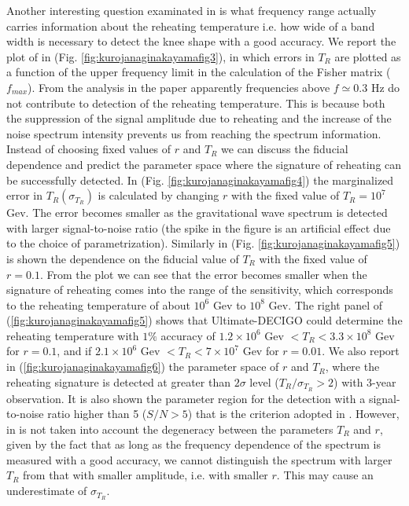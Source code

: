 \documentclass[11pt,a4paper,twoside]{book}
\begin{document}
Another interesting question examinated in \cite{Chap3:ProspectsForDeterminationWithDetectors} is what frequency range actually carries information about the reheating temperature i.e. how wide of a band  width is necessary to detect the knee shape with a good accuracy. We report the plot of \cite{Chap3:ProspectsForDeterminationWithDetectors} in (Fig. \ref{fig:kurojanaginakayamafig3}), in which errors in $ T_{R} $ are plotted as a function of the upper frequency limit in the calculation of the Fisher matrix ($ f_{max} $). From the analysis in the paper apparently frequencies above $ f \simeq 0.3$ Hz do not contribute to detection of the reheating temperature. This is because both the suppression of the signal amplitude due to reheating and the increase of the noise spectrum intensity prevents us from reaching the spectrum information.\\
Instead of choosing fixed values of $ r $ and $ T_{R} $ we can discuss the fiducial dependence and predict the parameter space where the signature of reheating can be successfully detected. In (Fig. \ref{fig:kurojanaginakayamafig4}) the marginalized error in $ T_{R}(\sigma_{T_{R}})$							
is calculated by changing $ r $ with the fixed value of $ T_{R}=10^{7} $ Gev. The error becomes smaller as the gravitational wave spectrum is detected with larger signal-to-noise ratio (the spike in the figure is an artificial effect due to the choice of parametrization). Similarly in (Fig. \ref{fig:kurojanaginakayamafig5}) is shown the dependence on the fiducial value of $ T_{R} $ with the fixed value of $ r = 0.1 $. From the plot we can see that the error becomes smaller when the signature of reheating comes into the range of the sensitivity, which corresponds to the reheating temperature of about $ 10^{6} $ Gev to $ 10^{8} $ Gev. The right panel of (\ref{fig:kurojanaginakayamafig5}) shows that Ultimate-DECIGO could determine the reheating temperature with $ 1 \% $ accuracy of $ 1.2 \times 10^{6} $ Gev $ < T_{R} <  3.3 \times 10^{8} $ Gev for $ r=0.1 $, and if $ 2.1 \times 10^{6} $ Gev  $ < T_{R} < 7 \times 10^{7} $ Gev for $ r=0.01 $. We also report in (\ref{fig:kurojanaginakayamafig6}) the parameter space of $ r $ and $ T_{R} $, where the reheating signature is detected at greater than $ 2\sigma $ level ($ T_{R} / \sigma_{T_{R}}  > 2$)  with 3-year observation. It is also shown the parameter region for the detection with a signal-to-noise ratio higher than 5 ($ S/N > 5 $) that is the criterion adopted in \cite{Chap3:ProibingReheatingTemperature2008}. However, in \cite{Chap3:ProibingReheatingTemperature2008} is not taken into account the degeneracy between the parameters $ T_{R} $ and $ r $, given by the fact that as long as the frequency dependence of the spectrum is measured with a good accuracy, we cannot distinguish the spectrum with larger $ T_{R} $ from that with smaller amplitude, i.e. with smaller $ r $. This may cause an underestimate of $ \sigma_{T_{R}} $.
\end{document}
